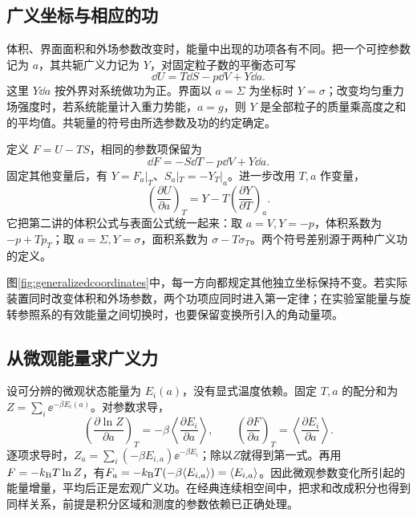 \subsection{广义坐标与相应的功}
\label{th:generalizedwork}
体积、界面面积和外场参数改变时，能量中出现的功项各有不同。把一个可控参数记为 $a$，其共轭广义力记为 $Y$，对固定粒子数的平衡态可写
\[
 \dd U=T\dd S-p\dd V+Y\dd a.
\]
这里 $Y\dd a$ 按外界对系统做功为正。界面以 $a=\Sigma$ 为坐标时 $Y=\sigma$；改变均匀重力场强度时，若系统能量计入重力势能，$a=g$，则 $Y$ 是全部粒子的质量乘高度之和的平均值。共轭量的符号由所选参数及功的约定确定。

定义 $F=U-TS$，相同的参数项保留为
\[
 \dd F=-S\dd T-p\dd V+Y\dd a.
\]
固定其他变量后，有 $Y=F_a|_T$、$S_a|_T=-Y_T|_a$。进一步改用 $T,a$ 作变量，
\[
 \left(\frac{\partial U}{\partial a}\right)_T
 =Y-T\left(\frac{\partial Y}{\partial T}\right)_a.
\]
它把第二讲的体积公式与表面公式统一起来：取 $a=V,Y=-p$，体积系数为 $-p+Tp_T$；取 $a=\Sigma,Y=\sigma$，面积系数为 $\sigma-T\sigma_T$。两个符号差别源于两种广义功的定义。

图\ref{fig:generalizedcoordinates}中，每一方向都规定其他独立坐标保持不变。若实际装置同时改变体积和外场参数，两个功项应同时进入第一定律；在实验室能量与旋转参照系的有效能量之间切换时，也要保留变换所引入的角动量项。

\subsection{从微观能量求广义力}
设可分辨的微观状态能量为 $E_i(a)$，没有显式温度依赖。固定 $T,a$ 的配分和为 $Z=\sum_i\ee^{-\beta E_i(a)}$。对参数求导，
\[
 \left(\frac{\partial\ln Z}{\partial a}\right)_T
 =-\beta\left\langle\frac{\partial E_i}{\partial a}\right\rangle,
 \qquad
 \left(\frac{\partial F}{\partial a}\right)_T
 =\left\langle\frac{\partial E_i}{\partial a}\right\rangle.
\]
逐项求导时，$Z_a=\sum_i(-\beta E_{i,a})\ee^{-\beta E_i}$；除以$Z$就得到第一式。再用$F=-k_{\mathrm B} T\ln Z$，有$F_a=-k_{\mathrm B} T(-\beta\langle E_{i,a}\rangle)=\langle E_{i,a}\rangle$。因此微观参数变化所引起的能量增量，平均后正是宏观广义功。在经典连续相空间中，把求和改成积分也得到同样关系，前提是积分区域和测度的参数依赖已正确处理。

